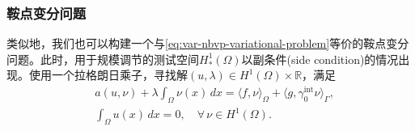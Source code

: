 \subsubsection{鞍点变分问题}
类似地，我们也可以构建一个与\eqref{eq:var-nbvp-variational-problem}等价的鞍点变分问题。此时，用于规模调节的测试空间$H_{*}^{1}(\Omega)$以副条件(side condition)的情况出现。使用一个拉格朗日乘子，寻找解$(u,\lambda) \in H^{1}(\Omega) \times \mathbb{R}$，满足
\begin{equation}
  \label{eq:var-nbvp-saddle-var}
  \begin{split}
    & a(u,\nu) + \lambda \int_{\Omega} \nu(x) \, d x =
    \langle f, \nu \rangle_{\Omega} +
    \langle g, \gamma_{0}^{\text{int}} \nu \rangle_{\Gamma}, \\
    & \int_{\Omega} u(x) \, dx = 0, \quad \forall \, \nu \in H^{1}(\Omega).
  \end{split}
\end{equation}

